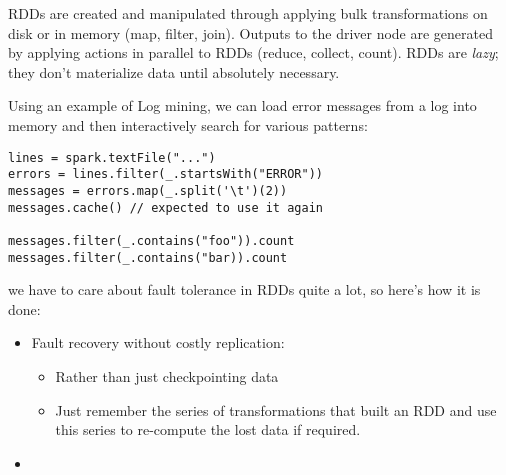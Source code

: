 \documentclass[11pt,a4paper,titlepage,dvipsnames,cmyk]{scrartcl}
\begin{document}
RDDs are created and manipulated through applying bulk transformations on disk or in memory (map, filter, join). Outputs to the driver node are generated by applying actions in parallel to RDDs (reduce, collect, count). RDDs are \textit{lazy}; they don't materialize data until absolutely necessary.

Using an example of Log mining, we can load error messages from a log into memory and then interactively search for various patterns:
\begin{lstlisting}
lines = spark.textFile("...")
errors = lines.filter(_.startsWith("ERROR"))
messages = errors.map(_.split('\t')(2))
messages.cache() // expected to use it again

messages.filter(_.contains("foo")).count
messages.filter(_.contains("bar)).count
\end{lstlisting}

we have to care about fault tolerance in RDDs quite a lot, so here's how it is done:
\begin{itemize}
    \item Fault recovery without costly replication:
    \begin{itemize}
        \item Rather than just checkpointing data
        \item Just remember the series of transformations that built an RDD and use this series to re-compute the lost data if required.
    \end{itemize}
    \item  
\end{itemize}
\end{document}
